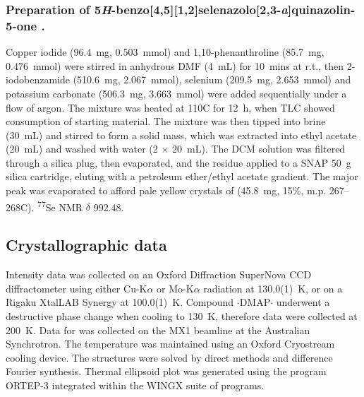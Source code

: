 \begin{refsection}
\subsubsection[Preparation of \refcmpd{tetracycle}.]{Preparation of 5\emph{H}-benzo[4,5][1,2]selenazolo[2,3-\emph{a}]quinazolin-5-one .}

Copper iodide (96.4~mg, 0.503~mmol) and 1,10-phenanthroline (85.7~mg, 0.476~mmol) were stirred in anhydrous DMF (4~mL) for 10~mins at r.t., then 2-iodobenzamide (510.6~mg, 2.067~mmol), selenium (209.5~mg, 2.653~mmol) and potassium carbonate (506.3~mg, 3.663~mmol) were added sequentially under a flow of argon.
The mixture was heated at 110\degree C for 12~h, when TLC showed consumption of starting material.
The mixture was then tipped into brine (30~mL) and stirred to form a solid mass, which was extracted into ethyl acetate (20~mL) and washed with water (2 $\times$ 20~mL).
The DCM solution was filtered through a silica plug, then evaporated, and the residue applied to a SNAP 50~g silica cartridge, eluting with a petroleum ether/ethyl acetate gradient.
The major peak was evaporated to afford pale yellow crystals of  (45.8~mg, 15\%, m.p. 267--268\degree C). \textsuperscript{77}Se NMR $\delta$ 992.48.

\subsection{Crystallographic data}
\label{sec:ch3-si}
Intensity data was collected on an Oxford Diffraction SuperNova CCD diffractometer using either Cu-K$\alpha$ or Mo-K$\alpha$ radiation at 130.0(1)~K, or on a Rigaku XtalLAB Synergy at 100.0(1)~K. Compound $\cdot$DMAP$\cdot$ underwent a destructive phase change when cooling to 130~K, therefore data were collected at 200~K. Data for  was collected on the MX1 beamline at the Australian Synchrotron\autocite{Cowieson2015}. The temperature was maintained using an Oxford Cryostream cooling device. The structures were solved by direct methods and difference Fourier synthesis.\autocite{Sheldrick2015} Thermal ellipsoid plot was generated using the program ORTEP-3\autocite{Farrugia1997} integrated within the WINGX\autocite{Farrugia1999} suite of programs.


\end{refsection}
